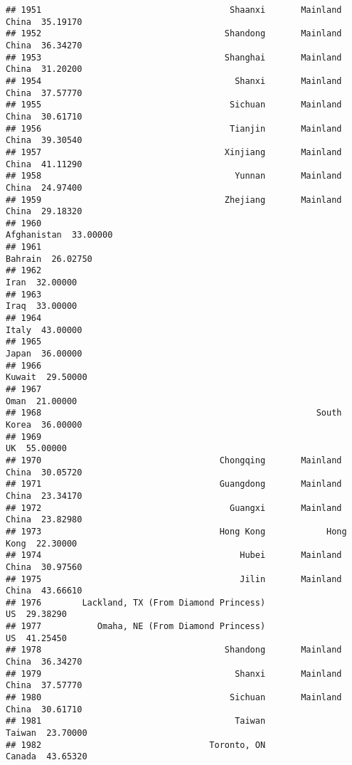 \documentclass[
]{article}
\begin{document}
\begin{verbatim}
## 1951                                     Shaanxi       Mainland China  35.19170
## 1952                                    Shandong       Mainland China  36.34270
## 1953                                    Shanghai       Mainland China  31.20200
## 1954                                      Shanxi       Mainland China  37.57770
## 1955                                     Sichuan       Mainland China  30.61710
## 1956                                     Tianjin       Mainland China  39.30540
## 1957                                    Xinjiang       Mainland China  41.11290
## 1958                                      Yunnan       Mainland China  24.97400
## 1959                                    Zhejiang       Mainland China  29.18320
## 1960                                                      Afghanistan  33.00000
## 1961                                                          Bahrain  26.02750
## 1962                                                             Iran  32.00000
## 1963                                                             Iraq  33.00000
## 1964                                                            Italy  43.00000
## 1965                                                            Japan  36.00000
## 1966                                                           Kuwait  29.50000
## 1967                                                             Oman  21.00000
## 1968                                                      South Korea  36.00000
## 1969                                                               UK  55.00000
## 1970                                   Chongqing       Mainland China  30.05720
## 1971                                   Guangdong       Mainland China  23.34170
## 1972                                     Guangxi       Mainland China  23.82980
## 1973                                   Hong Kong            Hong Kong  22.30000
## 1974                                       Hubei       Mainland China  30.97560
## 1975                                       Jilin       Mainland China  43.66610
## 1976        Lackland, TX (From Diamond Princess)                   US  29.38290
## 1977           Omaha, NE (From Diamond Princess)                   US  41.25450
## 1978                                    Shandong       Mainland China  36.34270
## 1979                                      Shanxi       Mainland China  37.57770
## 1980                                     Sichuan       Mainland China  30.61710
## 1981                                      Taiwan               Taiwan  23.70000
## 1982                                 Toronto, ON               Canada  43.65320

\end{verbatim}
\end{document}
